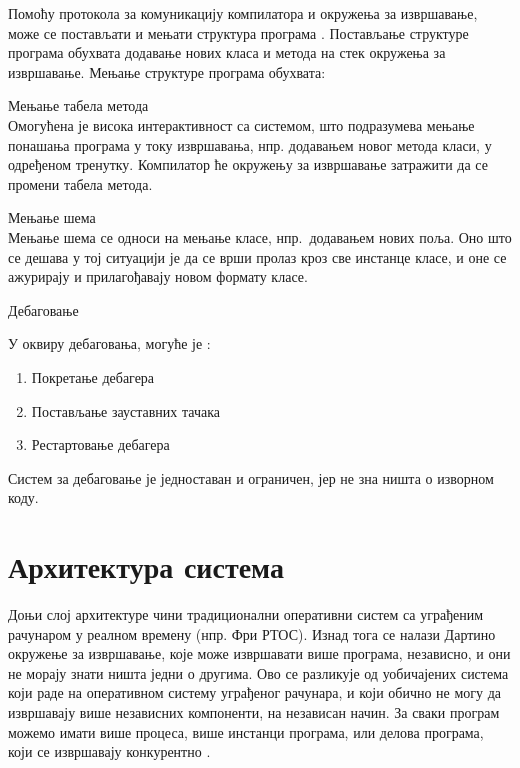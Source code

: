 \documentclass[12pt,oneside]{memoir}
\begin{document}
Помоћу протокола за комуникацију компилатора и окружења за извршавање, може се постављати и мењати структура програма \cite{Dartino}.
Постављање структуре програма обухвата додавање нових класа и метода на стек окружења за извршавање.
Мењање структуре програма обухвата:
\begin{description}
\item Мењање табела метода\\
Омогућена је висока интерактивност са системом, што подразумева мењање понашања програма у току извршавања, нпр. додавањем новог метода класи, у одређеном тренутку. Компилатор ће окружењу за извршавање затражити да се промени табела метода.
\item Мењање шема\\
Мењање шема се односи на мењање класе, нпр.~додавањем нових поља. Оно што се дешава у тој ситуацији је да се врши пролаз кроз све инстанце класе, и оне се ажурирају и прилагођавају новом формату класе.
\item Дебаговање

У оквиру дебаговања, могуће је \cite{Dartino}:
\begin{enumerate}
\item Покретање дебагера
\item Постављање зауставних тачака
\item Рестартовање дебагера
\end{enumerate}
Систем за дебаговање је једноставан и ограничен, јер не зна ништа о изворном коду.
\end{description}
\section{Архитектура система}

Доњи слој архитектуре чини традиционални оперативни систем са уграђеним рачунаром у реалном времену (нпр. Фри РТОС). Изнад тога се налази Дартино окружење за извршавање, које може извршавати више програма, независно, и они не морају знати ништа једни о другима. Ово се разликује од уобичајених система који раде на оперативном систему уграђеног рачунара, и који обично не могу да извршавају више независних компоненти, на независан начин. За сваки програм можемо имати више процеса, више инстанци програма, или делова програма, који се извршавају конкурентно \cite{Dartino}.
\end{document}

